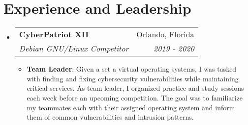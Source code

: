\documentclass[a4paper,20pt]{article}
\makeatletter
\newcommand{\resumeItem}[2]{
  \item\normalsize{
    \textbf{#1}{: #2 \vspace{1pt}}
  }
}
\newcommand{\resumeSubheading}[4]{
  \vspace{-1pt}\item
    \begin{tabular*}{.97\textwidth}{l@{\extracolsep{\fill}}r}
      \large\textbf{#1} & #2 \\
      \textit{#3} & \textit{#4} \\
    \end{tabular*}\vspace{-5pt}
}
\newcommand{\resumeSubHeadingListStart}{\begin{itemize}[leftmargin=*]}
\newcommand{\resumeSubHeadingListEnd}{\end{itemize}}
\newcommand{\resumeItemListStart}{\begin{itemize}}
\newcommand{\resumeItemListEnd}{\end{itemize}\vspace{-5pt}}
\makeatother
\begin{document}
    \section{Experience and Leadership}
        \resumeSubHeadingListStart
            \resumeSubheading{CyberPatriot XII}{Orlando, Florida}{Debian GNU/Linux Competitor}{2019 - 2020}
                \resumeItemListStart
                    \resumeItem{Team Leader}{Given a set a virtual operating systems, I was tasked with finding and fixing cybersecurity vulnerabilities while maintaining critical services. As team leader, I organized practice and study sessions each week before an upcoming competition. The goal was to familiarize my teammates each with their assigned operating system and inform them of common vulnerabilities and intrusion patterns.}
                \resumeItemListEnd
          \resumeSubHeadingListEnd
    
    
\end{document}
